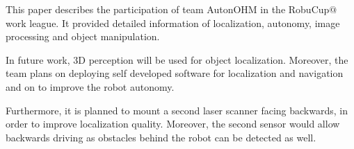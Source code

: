 
This paper describes the participation of team AutonOHM in the RobuCup$@$work league. It provided detailed information of localization, autonomy, image processing and object manipulation. 

In future work, 3D perception will be used for object localization. Moreover, the team plans on deploying self developed software for localization and navigation and on to improve the robot autonomy.

Furthermore, it is planned to mount a second laser scanner facing backwards, in order to improve localization quality. Moreover, the second sensor would allow backwards driving as obstacles behind the robot can be detected as well.
%
